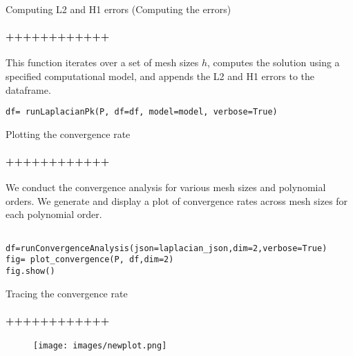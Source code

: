 \documentclass{beamer}
\begin{document}
\begin{frame}[fragile]{Computing L2 and H1 errors (Computing the errors)}
\framesubtitle{++++++++++++}

This function iterates over a set of mesh sizes $h$, computes the solution using a specified computational model, and appends the L2 and H1 errors to the dataframe.
\begin{lstlisting}
df= runLaplacianPk(P, df=df, model=model, verbose=True)

\end{lstlisting}

\end{frame}

\begin{frame}[fragile]{Plotting the convergence rate}
\framesubtitle{++++++++++++}


We conduct the convergence analysis for various mesh sizes and polynomial orders. We generate and display a plot of convergence rates across mesh sizes for each polynomial order.
\begin{lstlisting}
    
df=runConvergenceAnalysis(json=laplacian_json,dim=2,verbose=True)
fig= plot_convergence(P, df,dim=2)
fig.show()

\end{lstlisting}

\end{frame}






\begin{frame}[fragile]{Tracing the convergence rate}
\framesubtitle{++++++++++++}
\vspace*{-0cm}
\begin{figure}
    \centering
    \texttt{[image: images/newplot.png]} 
\end{figure}
\end{frame}


\end{document}
